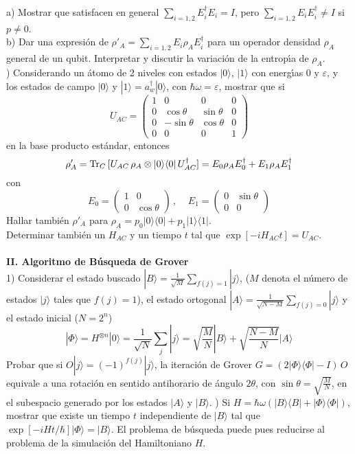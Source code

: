 \documentclass[12pt]{article}
\begin{document}
a) Mostrar que satisfacen en general $\sum_{i=1,2} E_i^\dagger E_i=I$, 
pero $\sum_{i=1,2} E_i E_i^\dagger\neq I$ si $p\neq 0$. \\
b) Dar una expresi\'on de $\rho'_A=\sum_{i=1,2} E_i\rho_A E_i^\dagger$ para un operador densidad $\rho_A$ general de un qubit. Interpretar y discutir la variaci\'on de la entrop\'{\i}a de $\rho_A$. \\\hfill{}) Considerando un \'atomo de 2 niveles con estados $|0
\rangle$, $|1\rangle$ con   energ\'{\i}as $0$ y $\varepsilon$, y los estados de campo $|0\rangle$ y $|1\rangle=a^\dagger_w|0\rangle$, con $\hbar\omega=\varepsilon$, mostrar que si 
\[U_{AC}=\left(\begin{array}{cccc}1&0&0&0\\0&\cos\theta&\sin\theta&0\\0&-\sin\theta&\cos\theta&0\\
0&0&0&1\end{array}\right)
\] 
en la base producto estándar, 
entonces 
\[\rho'_A={\rm Tr}_C\,[U_{AC}\,\rho_A\otimes|0\rangle\langle 0|\,U_{AC}^\dagger]=
E_0\rho_A E_0^\dagger+E_1\rho_A E_1^\dagger\]
con 
\[E_0=\left(\begin{array}{cc}1&0\\0&\cos\theta\end{array}\right)\,,\;\;\;\;
E_1=\left(\begin{array}{cc}0&\sin\theta\\0&0\end{array}\right)\]
Hallar tambi\'en 
$\rho'_A$ para $\rho_A=p_0|0\rangle\langle 0|+p_1|1\rangle\langle 1|$. \\

Determinar tambi\'en un $H_{AC}$ y un tiempo $t$ tal que $\exp[-iH_{AC}t]=U_{AC}$. 
\hfill\break \\ \\
{\bf II. Algoritmo de B\'usqueda de Grover} \\
1) Considerar el estado buscado $|B\rangle =\frac{1}{\sqrt{M}}\sum\limits_{f(j)=1}|j\rangle$, ($M$ denota el n\'umero de estados $|j\rangle$  tales que $f(j)=1$),  el estado ortogonal $|A\rangle=\frac{1}{\sqrt{N-M}}\sum\limits_{f(j)=0}|j\rangle$ y el estado inicial 
($N=2^n$)
\[|\Phi\rangle=H^{\otimes n}|0\rangle={\textstyle\frac{1}{\sqrt{N}}\sum_j|j\rangle=\sqrt{\frac{M}{N}}|B\rangle+\sqrt{\frac{N-M}{N}}|A\rangle}\]
Probar que si $O|j\rangle = (-1)^{f(j)}|j\rangle$, la iteraci\'on de Grover 
$G = (2|\Phi\rangle\langle\Phi|-I)\,O$ equivale
a una rotaci\'on en sentido antihorario de \'angulo $2\theta$, con $\sin\theta =\sqrt{\frac{M}{N}}$, en el subespacio
generado por los estados $|A\rangle$  y $|B\rangle$. 
\hfill\break{}) Si $H = \hbar\omega(|B\rangle\langle B| + |\Phi\rangle\langle\Phi|)$, mostrar que existe un tiempo $t$ independiente de $|B\rangle$ tal
que $\exp[-iHt/\hbar]|\Phi\rangle = |B\rangle$.  El problema de b\'usqueda puede pues reducirse al problema 
de la simulaci\'on del Hamiltoniano $H$.
\end{document}
